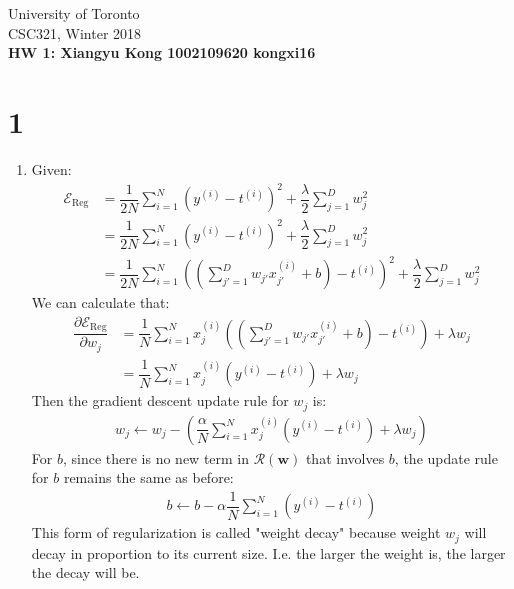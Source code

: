 \documentclass{article}
\begin{document}
\noindent
University of Toronto\\
{\sc CSC}321, Winter 2018\\[10pt]
{\LARGE\bf HW 1: Xiangyu Kong 1002109620 kongxi16} \\[10pt]

\section*{1}

\begin{enumerate}


\item   %
Given:
\begin{align*}
	\mathcal{E}_{\text{Reg}} &= \dfrac{1}{2N} \sum \limits_{i = 1}^{N} ( y^{(i)} - t^{(i)} )^2 + 
													\dfrac{\lambda}{2} \sum \limits_{j = 1}^{D} w_{j}^{2} \\
	&= \dfrac{1}{2N} \sum \limits_{i = 1}^{N} (y^{(i)} - t^{(i)})^{2}  + 
	\dfrac{\lambda}{2} \sum \limits_{j = 1}^{D} w_{j}^{2} \\
	&= \dfrac{1}{2N} \sum \limits_{i = 1}^{N} ((\sum \limits_{j' = 1}^{D} w_{j'} x_{j'}^{(i)} + b) - t^{(i)})^{2} + 
	\dfrac{\lambda}{2} \sum \limits_{j = 1}^{D} w_{j}^{2} 
\end{align*}
We can calculate that:
\begin{align*}
	\dfrac{\partial \mathcal{E}_{\text{Reg}}}{\partial w_{j}} &= \dfrac{1}{N} \sum \limits_{i = 1}^{N} x_{j}^{(i)} ( (\sum \limits_{j' = 1}^{D} w_{j'} x_{j'}^{(i)} + b) - t^{(i)}) + \lambda w_{j} \\
	&= \dfrac{1}{N} \sum \limits_{i = 1}^{N} x_{j}^{(i)} ( y^{(i)} - t^{(i)}) + \lambda w_{j}
\end{align*}
Then the gradient descent update rule for $w_{j}$ is: 
\begin{align*}
	w_{j} \leftarrow w_{j} - (\dfrac{\alpha}{N} \sum \limits_{i = 1}^{N} x_{j}^{(i)} ( y^{(i)} - t^{(i)}) + \lambda w_{j})
\end{align*}
For $b$, since there is no new term in $\mathcal{R}(\mathbf{w})$ that involves $b$, the update rule for $b$ remains the same as before:
\begin{align*}
	b \leftarrow b - \alpha \dfrac{1}{N} \sum \limits_{i = 1}^{N} ( y^{(i)} - t^{(i)})
\end{align*}
This form of regularization is called "weight decay" because weight $w_{j}$ will decay in proportion to its current size. I.e. the larger the weight is, the larger the decay will be.



\end{enumerate}
\end{document}
